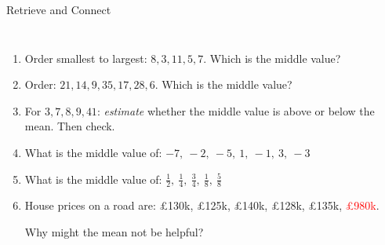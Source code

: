 \documentclass{beamer}
\newcommand{\ashow}[1]{\uncover<2->{\textcolor{red}{\small #1}}}
\begin{document}
\begin{frame}{Retrieve and Connect}
\begin{columns}[T]
\begin{enumerate}\itemsep1pt
\setcounter{enumi}{4}

  \item Order smallest to largest:
  $8,3,11,5,7$.
  Which is the middle value? \ashow{7}

  \item Order:
  $21,14,9,35,17,28,6$.
  Which is the middle value? \ashow{17}

  \item For $3,7,8,9,41$:
  \textit{estimate} whether the middle value is above or below the mean.
  Then check. \ashow{below: median $8$, mean $13.6$}

  \item What is the middle value of:
  $-7,\ -2,\ -5,\ 1,\ -1,\ 3,\ -3$ \ashow{$-2$}

  \item What is the middle value of:
  $\tfrac{1}{2},\ \tfrac{1}{4},\ \tfrac{3}{4},\ \tfrac{1}{8},\ \tfrac{5}{8}$ \ashow{$\frac{1}{2}$}

  \item House prices on a road are:
  \pounds130k,
  \pounds125k,
  \pounds140k,
  \pounds128k,
  \pounds135k,
  \textcolor{red}{\pounds980k}.

  Why might the mean not be helpful? \ashow{the \pounds980k outlier pulls the mean up}

\end{enumerate}

\end{columns}

\end{frame}
\end{document}
